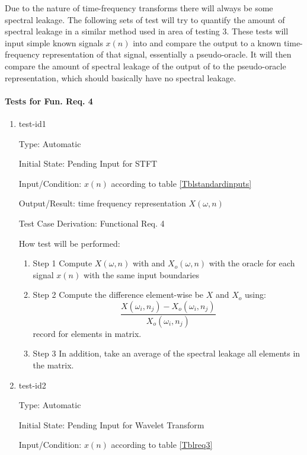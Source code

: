 \documentclass[12pt, titlepage]{article}
\begin{document}
Due to the nature of time-frequency transforms there will always be some spectral leakage. The following sets of test will try to quantify the amount of spectral leakage in a similar method used in area of testing 3. These tests will input simple known signals $x(n)$ into \progname{} and compare the output to a known time-frequency representation of that signal, essentially a pseudo-oracle. It will then compare the amount of spectral leakage of the output of \progname{} to the pseudo-oracle representation, which should basically have no spectral leakage.

\paragraph{Tests for Fun. Req. 4}

\begin{enumerate}

\item{test-id1\\}

Type: Automatic
					
Initial State: Pending Input for STFT
					
Input/Condition: $x(n)$ according to table \ref{Tblstandardinputs}
					
Output/Result: time frequency representation $X(\omega, n)$
	
Test Case Derivation: Functional Req. 4			
					
How test will be performed: 
\begin{enumerate}

\item{Step 1} Compute $X(\omega, n)$ with \progname and $X_o(\omega, n)$ with the oracle for each signal $x(n)$ with the same input boundaries
\item{Step 2} Compute the difference element-wise be $X$ and $X_o$ using:
\[ \frac{X(\omega_i, n_j) - X_o(\omega_i, n_j)}{X_o(\omega_i, n_j)} \]
record for elements in matrix.
\item{Step 3} In addition, take an average of the spectral leakage all elements in the matrix.
\end{enumerate}			

\item{test-id2\\}

Type: Automatic
					
Initial State: Pending Input for Wavelet Transform
					
Input/Condition: $x(n)$ according to table \ref{Tblreq3}
					

\end{enumerate}
\end{document}
